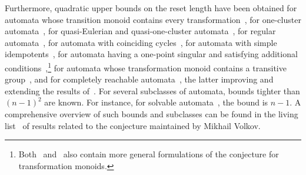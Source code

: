 Furthermore, quadratic upper bounds on the reset length have been obtained for automata whose transition monoid contains every transformation~\cite{DBLP:journals/ijfcs/GonzeGJGV19}, for one-cluster automata~\cite{BeaBerPer2011},
for quasi-Eulerian and quasi-one-cluster automata~\cite{DBLP:journals/ijfcs/Berlinkov13},
for regular automata~\cite{Rystsov1995a,Rystsov95a},
for automata with coinciding cycles~\cite{DBLP:conf/dlt/Ruszil23},
for automata with simple idempotents~\cite{Rystsov2000}, for automata having a one-point singular and satisfying additional conditions~\cite{Rystsov2024},\footnote{Both~\cite{AnanichevVolkov04} and~\cite{Rystsov2024} also contain more general formulations of the \Cerny conjecture for transformation monoids.} for automata whose transformation monoid contains a transitive group~\cite{DBLP:conf/fsttcs/000124a}, and for completely reachable automata~\cite{DBLP:conf/icalp/FerensS23}, the latter improving and extending the results of~\cite{DBLP:journals/ijfcs/GonzeGJGV19}. 
For several subclasses of automata, bounds tighter than $(n-1)^2$
are known. For instance, for solvable automata~\cite{Rystsov97}, the bound is $n - 1$. 
A comprehensive overview of such bounds and subclasses can be found in the living list~\cite{volkov2025listresultsvcernyconjecture} of results related to the \Cerny conjecture maintained by Mikhail Volkov.